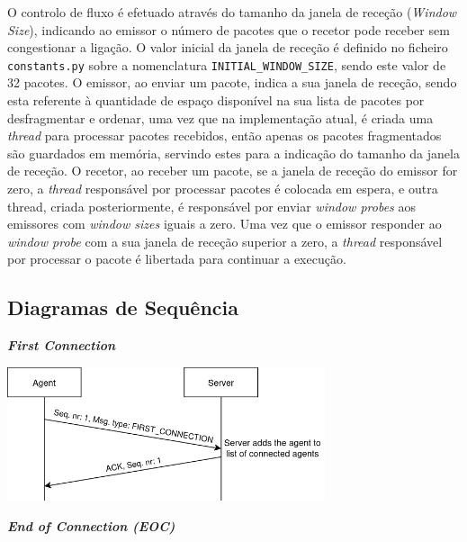 \documentclass[a4paper,12pt]{scrreprt}
\begin{document}
O controlo de fluxo é efetuado através do tamanho da janela de receção (\textit{Window Size}),
indicando ao emissor o número de pacotes que o recetor pode receber sem congestionar a ligação.
O valor inicial da janela de receção é definido no ficheiro \texttt{constants.py} sobre a nomenclatura
\texttt{INITIAL\_WINDOW\_SIZE}, sendo este valor de 32 pacotes. O emissor, ao enviar um pacote, indica
a sua janela de receção, sendo esta referente à quantidade de espaço disponível na sua lista de pacotes
por desfragmentar e ordenar, uma vez que na implementação atual, é criada uma \textit{thread} para processar
pacotes recebidos, então apenas os pacotes fragmentados são guardados em memória, servindo estes para a indicação
do tamanho da janela de receção.
O recetor, ao receber um pacote, se a janela de receção do emissor for zero,
a \textit{thread} responsável por processar pacotes é colocada em espera,
e outra thread, criada posteriormente, é responsável por enviar \textit{window probes}
aos emissores com \textit{window sizes} iguais a zero. Uma vez que o emissor
responder ao \textit{window probe} com a sua janela de receção superior a zero,
a \textit{thread} responsável por processar o pacote é libertada para continuar
a execução.

\subsection{Diagramas de Sequência}

\textbf{\textit{First Connection}}

\begin{minipage}{\textwidth}
    \centering
    \includegraphics[width=0.7\textwidth]{img/sequence_diagrams/first_connection.png}
    \label{fig:nt_first_connection}
\end{minipage}

\vspace{1cm}

\textbf{\textit{End of Connection (EOC)}}
\end{document}
